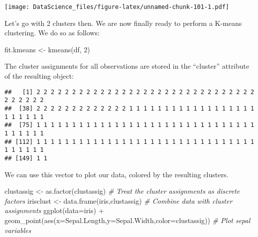 \documentclass[
]{book}
\newenvironment{Shaded}{\begin{snugshade}}{\end{snugshade}}
\newcommand{\AttributeTok}[1]{\textcolor[rgb]{0.77,0.63,0.00}{#1}}
\newcommand{\CommentTok}[1]{\textcolor[rgb]{0.56,0.35,0.01}{\textit{#1}}}
\newcommand{\DecValTok}[1]{\textcolor[rgb]{0.00,0.00,0.81}{#1}}
\newcommand{\FunctionTok}[1]{\textcolor[rgb]{0.00,0.00,0.00}{#1}}
\newcommand{\NormalTok}[1]{#1}
\newcommand{\OtherTok}[1]{\textcolor[rgb]{0.56,0.35,0.01}{#1}}
\newcommand{\SpecialCharTok}[1]{\textcolor[rgb]{0.00,0.00,0.00}{#1}}
\begin{document}
\texttt{[image: DataScience\_files/figure-latex/unnamed-chunk-101-1.pdf]}

Let's go with 2 clusters then. We are now finally ready to perform a K-means clustering. We do so as follows:

\begin{Shaded}
\begin{Highlighting}[]
\NormalTok{fit.kmeans }\OtherTok{\textless{}{-}} \FunctionTok{kmeans}\NormalTok{(df, }\DecValTok{2}\NormalTok{)}
\end{Highlighting}
\end{Shaded}

The cluster assignments for all observations are stored in the ``cluster'' attribute of the resulting object:

\begin{Shaded}
\end{Shaded}

\begin{verbatim}
##   [1] 2 2 2 2 2 2 2 2 2 2 2 2 2 2 2 2 2 2 2 2 2 2 2 2 2 2 2 2 2 2 2 2 2 2 2 2 2
##  [38] 2 2 2 2 2 2 2 2 2 2 2 2 2 1 1 1 1 1 1 1 1 1 1 1 1 1 1 1 1 1 1 1 1 1 1 1 1
##  [75] 1 1 1 1 1 1 1 1 1 1 1 1 1 1 1 1 1 1 1 1 1 1 1 1 1 1 1 1 1 1 1 1 1 1 1 1 1
## [112] 1 1 1 1 1 1 1 1 1 1 1 1 1 1 1 1 1 1 1 1 1 1 1 1 1 1 1 1 1 1 1 1 1 1 1 1 1
## [149] 1 1
\end{verbatim}

We can use this vector to plot our data, colored by the resulting clusters.

\begin{Shaded}
\begin{Highlighting}[]
\NormalTok{clustassig }\OtherTok{\textless{}{-}} \FunctionTok{as.factor}\NormalTok{(clustassig) }\CommentTok{\# Treat the cluster assignments as discrete factors}
\NormalTok{irisclust }\OtherTok{\textless{}{-}} \FunctionTok{data.frame}\NormalTok{(iris,clustassig) }\CommentTok{\# Combine data with cluster assignments}
\FunctionTok{ggplot}\NormalTok{(}\AttributeTok{data=}\NormalTok{iris) }\SpecialCharTok{+} \FunctionTok{geom\_point}\NormalTok{(}\FunctionTok{aes}\NormalTok{(}\AttributeTok{x=}\NormalTok{Sepal.Length,}\AttributeTok{y=}\NormalTok{Sepal.Width,}\AttributeTok{color=}\NormalTok{clustassig)) }\CommentTok{\# Plot sepal variables}
\end{Highlighting}
\end{Shaded}
\end{document}
